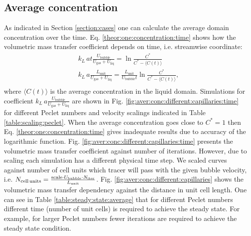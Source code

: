 \documentclass{article}
\newcommand{\beqal}{\begin{equation}\begin{aligned}}
\newcommand{\feqal}{\end{aligned}\end{equation}}
\newcommand{\vol}{k_L\,a}
\newcommand{\lunit}{L_{\mathrm{unit}}}
\newcommand{\ububble}{U_{\mathrm{bubble}}}
\newcommand{\uliq}{U_{\mathrm{liq}}}
\newcommand{\ugas}{U_{\mathrm{gas}}}
\newcommand{\cstar}{C^{*}}
\begin{document}
\subsection{Average concentration}
\label{main:results:periodic}
As indicated in Section \ref{section:cases} one can calculate the average domain concentration over
the time. Eq. \ref{theor:one:concentration:time} shows how 
the volumetric mass transfer coefficient depends on
time, i.e. streamwise coordinate:
\beqal
&\vol t \frac{\ububble}{\ugas+\uliq}=\ln\frac{\cstar}{\cstar-\langle C(t) \rangle}\\
&\vol \frac{\lunit}{\ugas+\uliq}=\frac{\lunit}{\ububble t} \ln \frac{C^*}{C^*-\langle C(t)
\rangle},\\
\feqal
where $\langle C(t) \rangle$ is the average concentration in the liquid domain.
Simulations for coefficient $\vol \frac{\ububble}{\ugas+\uliq}$ are shown in Fig.
\ref{fig:aver:conc:different:capillaries:time} for different Peclet numbers and velocity scalings
indicated in Table \ref{table:scaling:peclet}. When the average concentration goes
close to $\cstar=1$ then Eq. \ref{theor:one:concentration:time} gives inadequate results due to
 accuracy of the logarithmic function. Fig. \ref{fig:aver:conc:different:capillaries:time} presents
the volumetric mass transfer coefficient against number of iterations. However, due to scaling
each simulation has a different physical time step. We scaled curves against number of cell
units which tracer will pass with the given bubble velocity, i.e. 
$N_{\text{cell\,units}}=\frac{\text{scale}\cdot \ububble\cdot N_{\mathrm{iter}}}{\lunit}$.  Fig.
\ref{fig:aver:conc:different:capillaries} shows the volumetric mass transfer
dependency against the distance in unit cell length. One can see in Table
\ref{table:steady:state:average} that for different Peclet numbers different time (number of unit
cells) is required to achieve the steady state. For example, for
larger Peclet numbers fewer iterations are required to achieve the steady state condition. 
\end{document}
